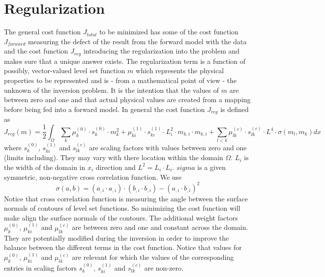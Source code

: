 \chapter{Regularization}\label{Chp:ref:regularization}

The general cost function $J_{total}$ to be minimized has some of the cost function $J_{forward}$ measuring the defect of the result from the  
forward model with the data and the cost function $J_{reg}$ introducing the regularization into the problem and makes sure 
that a unique answer exists. The regularization term is a function of possibly, vector-valued level set function  $m$ which 
represents the physical properties to be represented and is - from a mathematical point of view - the unknown
of the inversion problem. It is the intention that the values of $m$ are between zero and one and that
actual physical values are created from a mapping before being fed into a forward model. In general the cost function $J_{reg}$ is 
defined as 
\begin{equation}\label{EQU:REG:1}
J_{reg}(m) = \frac{1}{2} \int_{\Omega} 
 \sum_{k} \mu^{(0)}_k \cdot s^{(0)}_k \cdot m_k^2 +  \mu^{(1)}_{ki} \cdot s^{(1)}_{ki} \cdot L_i^2  \cdot m_{k,i} \cdot m_{k,i}
+  \sum_{l<k} \mu^{(c)}_{lk} \cdot s^{(c)}_{lk} \cdot L^4  \cdot  \sigma(m_l,m_k) dx 
\end{equation} 
where $s^{(0)}_k$, $s^{(1)}_{ki}$ and $s^{(c)}_{lk}$ are scaling factors with values between
zero and one (limits including). They may vary with there location within the domain $\Omega$.  $L_i$ is the width of the domain in $x_i$ direction and $L^2=L_i \cdot L_i$.
$sigma$ is a given symmetric, non-negative cross correlation function. We use
\begin{equation}\label{EQU:REG:4}
 \sigma(a,b) =  ( a_{,i} \cdot a_{,i}) \cdot ( b_{,i} \cdot b_{,i}) -   ( a_{,i} \cdot b_{,i})^2 
\end{equation} 
Notice that cross correlation function is measuring the angle between the surface normals of contours of level set functions. So 
minimizing the cost function will make align the surface normals of the contours.
The additional weight factors $\mu^{(0)}_k$, $ \mu^{(1)}_{ki}$ and $\mu^{(c)}_{lk}$ are between zero and one and constant across the 
domain. They are potentially modified during the inversion in order to improve the balance between the different terms 
in the cost function. Notice that values for $\mu^{(0)}_k$, $ \mu^{(1)}_{ki}$ and $\mu^{(c)}_{lk}$ are relevant for which 
the values of the corresponding entries in scaling factors $s^{(0)}_k$, $s^{(1)}_{ki}$ and $s^{(c)}_{lk}$ are non-zero.
